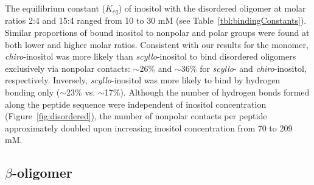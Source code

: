 The equilibrium constant ($K_{eq}$) of inositol with the disordered oligomer at molar ratios 2:4 and 15:4 ranged from 10 to 30 mM (see Table~\ref{tbl:bindingConstants}).
Similar proportions of bound inositol to nonpolar and polar groups were found at both lower and higher molar ratios. 
Consistent with our results for the monomer, \emph{chiro}-inositol was more likely than \emph{scyllo}-inositol to bind disordered oligomers exclusively via nonpolar contacts: $\sim$26\% and $\sim$36\% for \emph{scyllo}- and \emph{chiro}-inositol, respectively.  
Inversely, \emph{scyllo}-inositol was more likely to bind by hydrogen bonding only ($\sim$23\% vs. $\sim$17\%). Although the number of hydrogen bonds formed along the peptide sequence were independent of inositol concentration (Figure~\ref{fig:disordered}), %
the number of nonpolar contacts per peptide approximately doubled upon increasing inositol concentration from 70 to 209 mM.

\subsection{$\beta$-oligomer}

